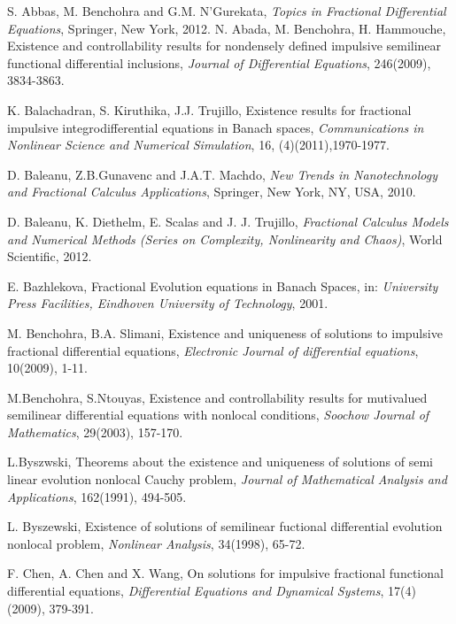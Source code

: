 \documentclass[11pt]{article}
\begin{document}
\begin{thebibliography}{USA00}

 S. Abbas, M. Benchohra and G.M. N'Gurekata, {\it Topics in Fractional Differential Equations}, Springer, New York, 2012.
 N. Abada, M. Benchohra, H. Hammouche, Existence and controllability results for nondensely defined impulsive semilinear functional differential inclusions, {\it Journal of Differential Equations}, 246(2009), 3834-3863.

 K. Balachadran, S. Kiruthika, J.J. Trujillo, Existence results for fractional impulsive integrodifferential equations in Banach spaces, {\it Communications in Nonlinear Science and Numerical Simulation}, 16, (4)(2011),1970-1977.

 D. Baleanu, Z.B.Gunavenc and J.A.T. Machdo, {\it New Trends in Nanotechnology and Fractional Calculus Applications}, Springer, New York, NY, USA, 2010.



 D. Baleanu, K. Diethelm, E. Scalas and J. J. Trujillo, {\it Fractional Calculus Models and Numerical Methods (Series on Complexity, Nonlinearity and Chaos)}, World Scientific, 2012.

 E. Bazhlekova, Fractional Evolution equations in Banach Spaces, in: {\it University Press Facilities, Eindhoven University of Technology}, 2001.

 M. Benchohra, B.A. Slimani, Existence and uniqueness of solutions to impulsive fractional differential equations, {\it Electronic Journal of differential equations}, 10(2009), 1-11.



M.Benchohra, S.Ntouyas, Existence and controllability results for mutivalued semilinear differential equations with nonlocal conditions, {\it Soochow Journal of Mathematics}, 29(2003), 157-170.

L.Byszwski, Theorems about the existence and uniqueness of solutions of semi linear evolution nonlocal Cauchy problem, {\it Journal of Mathematical Analysis and Applications}, 162(1991), 494-505.

L. Byszewski, Existence of solutions of semilinear fuctional differential evolution nonlocal problem, {\it Nonlinear Analysis}, 34(1998), 65-72.



 F. Chen, A. Chen and X. Wang, On solutions for impulsive fractional functional differential equations, {\it Differential Equations and Dynamical Systems}, 17(4)(2009), 379-391.



\end{thebibliography}
\end{document}
